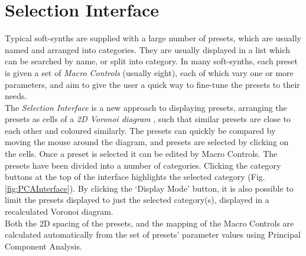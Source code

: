 \documentclass[11pt, oneside]{report}   	%
\begin{document}
\section{Selection Interface}
Typical soft-synths are supplied with a large number of presets, which are usually named and arranged into categories. They are usually displayed in a list which can be searched by name, or split into category. In many soft-synths, each preset is given a set of \emph{Macro Controls} (usually eight), each of which vary one or more parameters, and aim to give the user a quick way to fine-tune the presets to their needs.\\
The \emph{Selection Interface} is a new approach to displaying presets, arranging the presets as cells of a \emph{2D Voronoi diagram} \cite{Voronoi}, such that similar presets are close to each other and coloured similarly. The presets can quickly be compared by moving the mouse around the diagram, and presets are selected by clicking on the cells. Once a preset is selected it can be edited by Macro Controls. 
The presets have been divided into a number of categories. Clicking the category buttons at the top of the interface highlights the selected category (Fig. \ref{fig:PCAInterface}). By clicking the `Display Mode' button, it is also possible to limit the presets displayed to just the selected category(s), displayed in a recalculated Voronoi diagram.\\
Both the 2D spacing of the presets, and the mapping of the Macro Controls are calculated automatically from the set of presets' parameter values using Principal Component Analysis.
\end{document}

